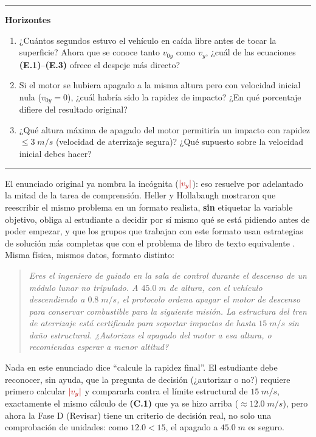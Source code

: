 \documentclass[11pt]{book}
\newcommand{\incog}[1]{\textcolor{colIncog}{#1}}
\begin{document}
\begin{enumerate}
\begin{description}
\medskip
\noindent\rule{\linewidth}{0.4pt}
\noindent\textbf{Horizontes}
\medskip

\begin{enumerate}
    \item ¿Cuántos segundos estuvo el vehículo en caída libre antes de tocar la superficie? Ahora que se conoce tanto $v_{0y}$ como $v_y$, ¿cuál de las ecuaciones \textbf{(E.1)}–\textbf{(E.3)} ofrece el despeje más directo?
    \item Si el motor se hubiera apagado a la misma altura pero con velocidad inicial nula ($v_{0y} = 0$), ¿cuál habría sido la rapidez de impacto? ¿En qué porcentaje difiere del resultado original?
    \item ¿Qué altura máxima de apagado del motor permitiría un impacto con rapidez $\leq 3\;m/s$ (velocidad de aterrizaje segura)? ¿Qué supuesto sobre la velocidad inicial debes hacer?
\end{enumerate}
\end{description}
\end{enumerate}

\medskip
\noindent\rule{\linewidth}{0.4pt}
\medskip

El enunciado original ya nombra la incógnita ($\incog{|v_y|}$): eso resuelve por adelantado la mitad de la tarea de comprensión. Heller y Hollabaugh mostraron que reescribir el mismo problema en un formato realista, {\bf sin} etiquetar la variable objetivo, obliga al estudiante a decidir por sí mismo qué se está pidiendo antes de poder empezar, y que los grupos que trabajan con este formato usan estrategias de solución más completas que con el problema de libro de texto equivalente \cite{Heller1992}. Misma física, mismos datos, formato distinto:

\begin{quote}
{\small\it
Eres el ingeniero de guiado en la sala de control durante el descenso de un módulo lunar no tripulado. A $45.0\;m$ de altura, con el vehículo descendiendo a $0.8\;m/s$, el protocolo ordena apagar el motor de descenso para conservar combustible para la siguiente misión. La estructura del tren de aterrizaje está certificada para soportar impactos de hasta $15\;m/s$ sin daño estructural. ¿Autorizas el apagado del motor a esa altura, o recomiendas esperar a menor altitud?
}
\end{quote}

Nada en este enunciado dice ``calcule la rapidez final''. El estudiante debe reconocer, sin ayuda, que la pregunta de decisión (¿autorizar o no?) requiere primero calcular $\incog{|v_y|}$ y compararla contra el límite estructural de $15\;m/s$, exactamente el mismo cálculo de \textbf{(C.1)} que ya se hizo arriba ($\approx 12.0\;m/s$), pero ahora la Fase D (Revisar) tiene un criterio de decisión real, no solo una comprobación de unidades: como $12.0 < 15$, el apagado a $45.0\;m$ es seguro.
\end{document}
